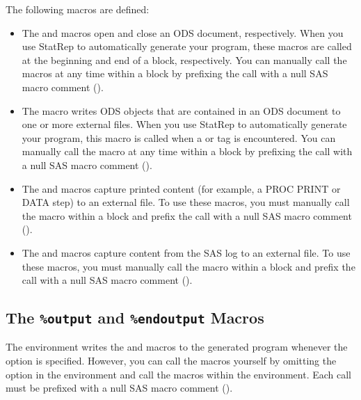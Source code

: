 \documentclass[article,oneside]{memoir}
\newcommand*{\StatRep}{\textsf{StatRep}\xspace}
\begin{document}
  The following macros are defined:
  \begin{itemize}
  \item The  and  macros open and close an ODS document, respectively.
  When you use \StatRep to automatically generate your program, these macros are called at the
  beginning and end of a  block, respectively.
  You can manually call the macros at any time within
  a  block by prefixing the call with a null SAS macro comment (\Code{\%*;}).

  \item The   macro writes ODS objects that are contained in an ODS document to
  one or more external files.
  When you use \StatRep to automatically generate your program, this macro is called when
  a  or  tag is encountered. You can manually call the macro
  at any time within a  block by prefixing the call with a null
  SAS macro comment (\Code{\%*;}).

  \item The  and  macros capture printed content
  (for example, a PROC PRINT or DATA step) to an external file. To use these macros,
  you must manually call the macro
  within a  block and prefix the call with a null
  SAS macro comment (\Code{\%*;}).

  \item The  and  macros capture content from the
  SAS log to an external file. To use these macros,
  you must manually call the macro
  within a  block and prefix the call with a null
  SAS macro comment (\Code{\%*;}).
  \end{itemize}


  \subsection{The \texttt{\%output} and \texttt{\%endoutput} Macros}\label{outputmacro}
  The  environment writes the  and  macros to
  the generated program
  whenever the  option is specified.
  However, you can call the macros
  yourself by omitting the  option in the  environment and
  call the macros within the  environment. Each call must be prefixed
  with a null SAS macro comment (\Code{\%*;}).
\end{document}
